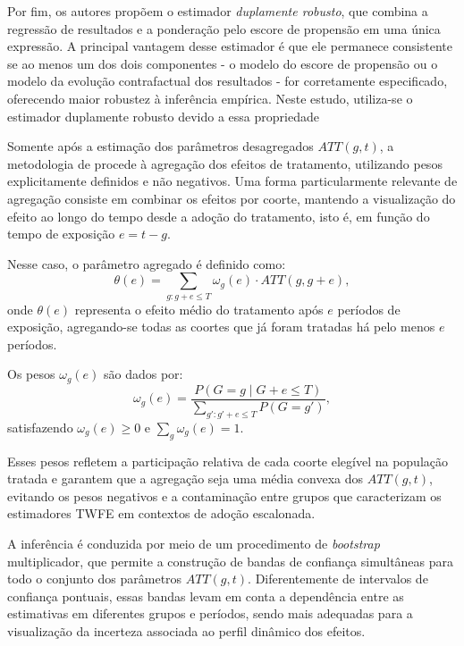 \documentclass[12pt,a4paper,oneside]{article}
\begin{document}
Por fim, os autores propõem o estimador \textit{duplamente robusto}, que combina a regressão de resultados e a ponderação pelo escore de propensão em uma única expressão. A principal vantagem desse estimador é que ele permanece consistente se ao menos um dos dois componentes - o modelo do escore de propensão ou o modelo da evolução contrafactual dos resultados - for corretamente especificado, oferecendo maior robustez à inferência empírica. Neste estudo, utiliza-se o estimador duplamente robusto devido a essa propriedade


Somente após a estimação dos parâmetros desagregados \( ATT(g,t) \), a metodologia de \citet{Callaway2021} procede à agregação dos efeitos de tratamento, utilizando pesos explicitamente definidos e não negativos. Uma forma particularmente relevante de agregação consiste em combinar os efeitos por coorte, mantendo a visualização do efeito ao longo do tempo desde a adoção do tratamento, isto é, em função do tempo de exposição \( e = t - g \).

Nesse caso, o parâmetro agregado é definido como:
\[
\theta(e) = \sum_{g : g + e \leq T} \omega_g(e) \cdot ATT(g, g+e),
\]
onde \( \theta(e) \) representa o efeito médio do tratamento após \( e \) períodos de exposição, agregando-se todas as coortes que já foram tratadas há pelo menos \( e \) períodos.

Os pesos \( \omega_g(e) \) são dados por:
\[
\omega_g(e) =
\frac{P(G = g \mid G + e \leq T)}
{\sum_{g' : g' + e \leq T} P(G = g')},
\]
satisfazendo \( \omega_g(e) \geq 0 \) e \( \sum_g \omega_g(e) = 1 \).

Esses pesos refletem a participação relativa de cada coorte elegível na população tratada e garantem que a agregação seja uma média convexa dos \( ATT(g,t) \), evitando os pesos negativos e a contaminação entre grupos que caracterizam os estimadores TWFE em contextos de adoção escalonada.

A inferência é conduzida por meio de um procedimento de \textit{bootstrap} multiplicador, que permite a construção de bandas de confiança simultâneas para todo o conjunto dos parâmetros $ATT(g,t)$. Diferentemente de intervalos de confiança pontuais, essas bandas levam em conta a dependência entre as estimativas em diferentes grupos e períodos, sendo mais adequadas para a visualização da incerteza associada ao perfil dinâmico dos efeitos.
\end{document}
